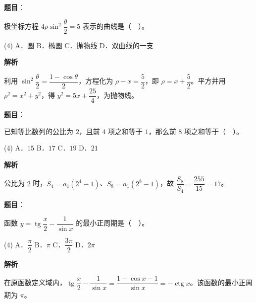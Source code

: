 \begin{answer}

\textbf{题目}：

极坐标方程 $4\rho\sin^2\dfrac\theta2=5$ 表示的曲线是（　）。

\begin{gkopts}(4)
\task A．圆
\task B．椭圆
\task C．抛物线
\task D．双曲线的一支
\end{gkopts}

\textbf{解析}

利用 $\sin^2\dfrac\theta2=\dfrac{1-\cos\theta}{2}$，方程化为 $\rho-x=\dfrac52$，即 $\rho=x+\dfrac52$。平方并用 $\rho^2=x^2+y^2$，得 $y^2=5x+\dfrac{25}{4}$，为抛物线。


\end{answer}
\begin{answer}

\textbf{题目}：

已知等比数列的公比为 $2$，且前 $4$ 项之和等于 $1$，那么前 $8$ 项之和等于（　）。

\begin{gkopts}(4)
\task A．$15$
\task B．$17$
\task C．$19$
\task D．$21$
\end{gkopts}

\textbf{解析}

公比为 $2$ 时，$S_4=a_1(2^4-1)$、$S_8=a_1(2^8-1)$，故 $\dfrac{S_8}{S_4}=\dfrac{255}{15}=17$。


\end{answer}
\begin{answer}

\textbf{题目}：

函数 $y=\operatorname{tg}\dfrac x2-\dfrac1{\sin x}$ 的最小正周期是（　）。

\begin{gkopts}(4)
\task A．$\dfrac\pi2$
\task B．$\pi$
\task C．$\dfrac{3\pi}2$
\task D．$2\pi$
\end{gkopts}

\textbf{解析}

在原函数定义域内，$\operatorname{tg}\dfrac x2-\dfrac1{\sin x}=\dfrac{1-\cos x-1}{\sin x}=-\operatorname{ctg}x$。该函数的最小正周期为 $\pi$。


\end{answer}
